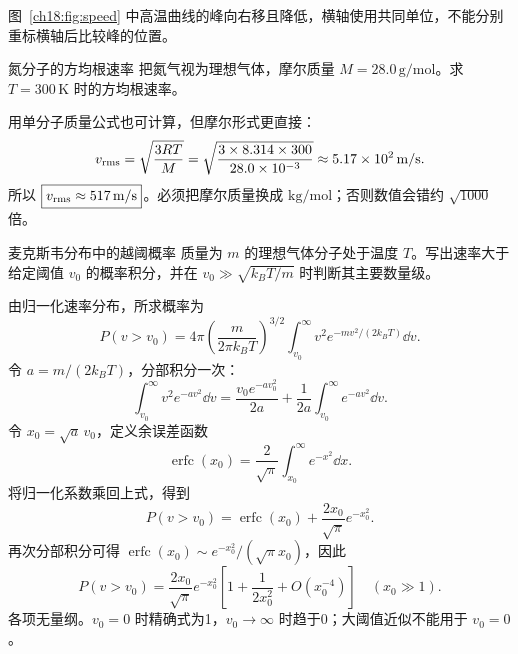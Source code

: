 \begin{center}\begin{minipage}{\linewidth}\centering
{}
\label{ch18:fig:speed}
\end{minipage}\end{center}
图~\ref{ch18:fig:speed} 中高温曲线的峰向右移且降低，横轴使用共同单位，不能分别重标横轴后比较峰的位置。

\begin{origexamplebox}{氮分子的方均根速率}
把氮气视为理想气体，摩尔质量 $M=28.0\,\mathrm{g/mol}$。求 $T=300\,\mathrm K$ 时的方均根速率。

\StatQSpeeds
\end{origexamplebox}
\begin{xesolution}
用单分子质量公式也可计算，但摩尔形式更直接：
\[
 v_{\rm rms}=\sqrt{\frac{3RT}{M}}
 =\sqrt{\frac{3\times8.314\times300}{28.0\times10^{-3}}}
 \approx5.17\times10^2\,\mathrm{m/s}.
\]
所以 $\boxed{v_{\rm rms}\approx517\,\mathrm{m/s}}$。必须把摩尔质量换成 $\mathrm{kg/mol}$；否则数值会错约 $\sqrt{1000}$ 倍。

\StatASpeeds
\end{xesolution}

\begin{origexamplebox}{麦克斯韦分布中的越阈概率}
质量为 $m$ 的理想气体分子处于温度 $T$。写出速率大于给定阈值 $v_0$ 的概率积分，并在
$v_0\gg\sqrt{k_BT/m}$ 时判断其主要数量级。

\StatQTail
\end{origexamplebox}
\begin{xesolution}
由归一化速率分布，所求概率为
\[
 P(v>v_0)=4\pi\left(\frac{m}{2\pi k_BT}\right)^{3/2}
 \int_{v_0}^{\infty}v^2e^{-mv^2/(2k_BT)}\dd v.
\]
令 $a=m/(2k_BT)$，分部积分一次：
\[
 \int_{v_0}^{\infty}v^2e^{-av^2}\dd v
 =\frac{v_0e^{-av_0^2}}{2a}
 +\frac1{2a}\int_{v_0}^{\infty}e^{-av^2}\dd v.
\]
令 $x_0=\sqrt a\,v_0$，定义余误差函数
\[\operatorname{erfc}(x_0)=\frac2{\sqrt\pi}\int_{x_0}^{\infty}e^{-x^2}\dd x.\]
将归一化系数乘回上式，得到
\[
 \boxed{P(v>v_0)=\operatorname{erfc}(x_0)+\frac{2x_0}{\sqrt\pi}e^{-x_0^2}}.
\]
再次分部积分可得 $\operatorname{erfc}(x_0)\sim e^{-x_0^2}/(\sqrt\pi x_0)$，因此
\[P(v>v_0)=\frac{2x_0}{\sqrt\pi}e^{-x_0^2}
\left[1+\frac1{2x_0^2}+O(x_0^{-4})\right]\quad(x_0\gg1).\]
各项无量纲。$v_0=0$ 时精确式为1，$v_0\to\infty$ 时趋于0；大阈值近似不能用于 $v_0=0$。

\StatATail
\end{xesolution}

